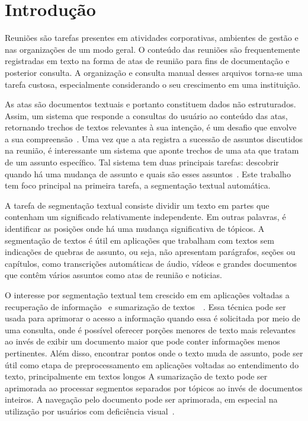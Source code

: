 

\section{Introdução}
	\label{sec:introducao}

Reuniões são tarefas presentes em atividades corporativas, ambientes de gestão e nas organizações de um modo geral. O conteúdo das reuniões são frequentemente registradas em texto na forma de atas de reunião para fins de documentação e posterior consulta. A organização e consulta manual desses arquivos torna-se uma tarefa custosa, especialmente considerando o seu crescimento em uma instituição. 

As atas são documentos textuais e portanto constituem dados não estruturados. Assim, um sistema que responde a consultas do usuário ao conteúdo das atas, retornando trechos de textos relevantes à sua intenção, é um desafio que envolve a sua compreensão~\cite{Bokaei2015}. 
Uma vez que a ata registra a sucessão de assuntos discutidos na reunião, é interessante um sistema que aponte trechos de uma ata que tratam de um assunto específico. Tal sistema tem duas principais tarefas: descobrir quando há uma mudança de assunto e quais são esses assuntos~\cite{Banerjee2006}. Este trabalho tem foco principal na primeira tarefa, a segmentação textual automática. 



A tarefa de segmentação textual consiste dividir um texto em partes que contenham um significado relativamente independente. Em outras palavras, é identificar as posições onde há uma mudança significativa de tópicos. A segmentação de textos é útil em aplicações que trabalham com textos sem indicações de quebras de assunto, ou seja, não apresentam parágrafos, seções ou capítulos, como transcrições automáticas de áudio, vídeos e grandes documentos que contêm vários assuntos como atas de reunião e noticias.


O interesse por segmentação textual tem crescido em em aplicações voltadas a recuperação de informação~\cite{Reynar1999} %
e sumarização de textos~\cite{Boguraev2000}~\cite{Boguraev2000b}. %
Essa técnica pode ser usada para aprimorar o acesso a informação quando essa é solicitada por meio de uma consulta, onde é possível oferecer porções menores de texto mais relevantes ao invés de exibir um documento maior que pode conter informações menos pertinentes. 
%
Além disso, encontrar pontos onde o texto muda de assunto, pode ser útil como etapa de preprocessamento em aplicações voltadas ao entendimento do texto, principalmente em textos longos
%
A sumarização de texto pode ser aprimorada ao processar segmentos separados por tópicos ao invés de documentos inteiros. A navegação pelo documento pode ser aprimorada, em especial na utilização por usuários com deficiência visual~\cite{Choi2000}. 



